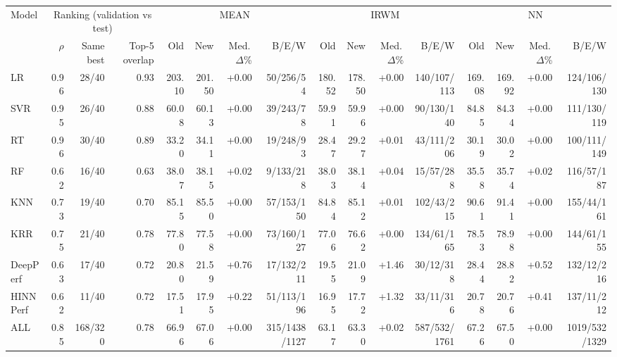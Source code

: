 \begin{tabular}{lrrrrrrrrrrrrrrr}
\toprule
Model & \multicolumn{3}{c}{Ranking (validation vs test)} & \multicolumn{4}{c}{MEAN} & \multicolumn{4}{c}{IRWM} & \multicolumn{4}{c}{NN} \\
 & $\rho$ & Same best & Top-5 overlap & Old & New & Med.\,$\Delta$\% & B/E/W & Old & New & Med.\,$\Delta$\% & B/E/W & Old & New & Med.\,$\Delta$\% & B/E/W \\
\midrule
LR & 0.96 & 28/40 & 0.93 & 203.10 & 201.50 & +0.00 & 50/256/54 & 180.52 & 178.50 & +0.00 & 140/107/113 & 169.08 & 169.92 & +0.00 & 124/106/130 \\
SVR & 0.95 & 26/40 & 0.88 & 60.08 & 60.13 & +0.00 & 39/243/78 & 59.91 & 59.96 & +0.00 & 90/130/140 & 84.85 & 84.34 & +0.00 & 111/130/119 \\
RT & 0.96 & 30/40 & 0.89 & 33.20 & 34.11 & +0.00 & 19/248/93 & 28.47 & 29.27 & +0.01 & 43/111/206 & 30.19 & 30.02 & +0.00 & 100/111/149 \\
RF & 0.62 & 16/40 & 0.63 & 38.07 & 38.15 & +0.02 & 9/133/218 & 38.03 & 38.14 & +0.04 & 15/57/288 & 35.58 & 35.74 & +0.02 & 116/57/187 \\
KNN & 0.73 & 19/40 & 0.70 & 85.15 & 85.50 & +0.00 & 57/153/150 & 84.84 & 85.12 & +0.01 & 102/43/215 & 90.61 & 91.41 & +0.00 & 155/44/161 \\
KRR & 0.75 & 21/40 & 0.78 & 77.80 & 77.58 & +0.00 & 73/160/127 & 77.06 & 76.62 & +0.00 & 134/61/165 & 78.53 & 78.98 & +0.00 & 144/61/155 \\
DeepPerf & 0.63 & 17/40 & 0.72 & 20.80 & 21.59 & +0.76 & 17/132/211 & 19.55 & 21.09 & +1.46 & 30/12/318 & 28.44 & 28.82 & +0.52 & 132/12/216 \\
HINNPerf & 0.62 & 11/40 & 0.72 & 17.51 & 17.95 & +0.22 & 51/113/196 & 16.95 & 17.72 & +1.32 & 33/11/316 & 20.78 & 20.76 & +0.41 & 137/11/212 \\
ALL & 0.85 & 168/320 & 0.78 & 66.96 & 67.06 & +0.00 & 315/1438/1127 & 63.17 & 63.30 & +0.02 & 587/532/1761 & 67.26 & 67.50 & +0.00 & 1019/532/1329 \\
\bottomrule
\end{tabular}
